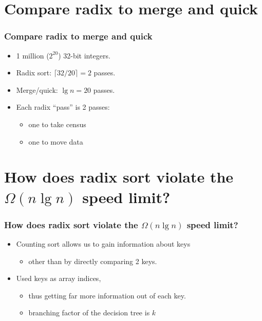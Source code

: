\documentclass{beamer}
\newcommand{\bi}{\begin{itemize}}
\newcommand{\ii}{\item}
\newcommand{\ei}{\end{itemize}}
\newcommand{\sect}[1]{
\section{#1}
\begin{frame}[fragile]\frametitle{#1}
}
\begin{document}
\sect{Compare radix to merge and quick}
\bi
\ii 1 million ($2^{20}$) 32-bit integers.
\ii Radix sort: $\lceil 32/20 \rceil = 2$ passes.
\ii Merge/quick: $\lg n = 20$ passes.
\ii Each radix ``pass'' is 2 passes:
\bi \ii one to take census
\ii one to move data \ei
\ei

\end{frame}

\sect{How does radix sort violate the $\Omega(n\lg n)$ speed limit?}
\bi
\ii Counting sort allows us to gain information
about keys\bi\ii other than by directly comparing 2 keys.\ei
\ii Used keys as array indices,
\bi\ii thus getting far more information out
of each key.
\ii branching factor of the decision tree is $k$
\ei
\ei

\end{frame}
\end{document}

